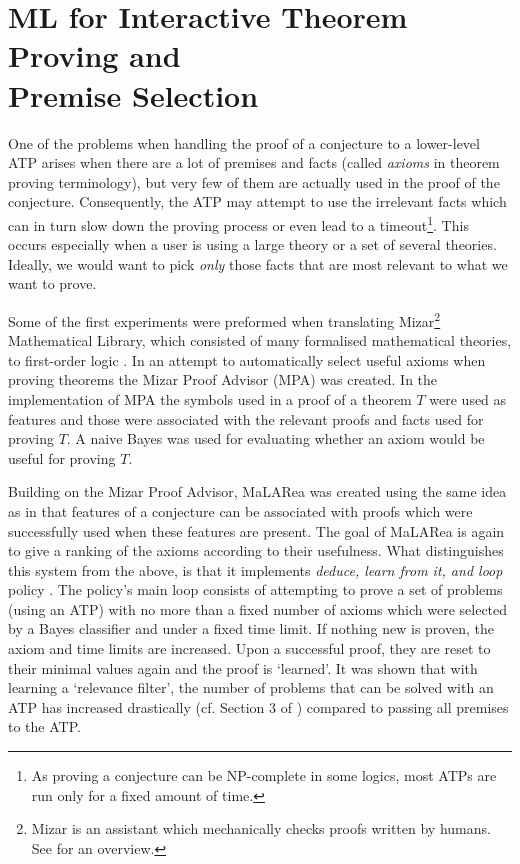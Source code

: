 \documentclass{article}
\begin{document}
\section{ML for Interactive Theorem Proving and\\ Premise Selection}

One of the problems when handling the proof of a conjecture to a lower-level
ATP arises when there are a lot of premises and facts (called \emph{axioms} in
theorem proving terminology), but very few of them are actually used in the
proof of the conjecture. Consequently, the ATP may attempt to use the
irrelevant facts which can in turn slow down the proving process or even lead
to a timeout\footnote{As proving a conjecture can be NP-complete in some
logics, most ATPs are run only for a fixed amount of time.}. This occurs
especially when a user is using a large theory or a set of several theories.
Ideally, we would want to pick \emph{only} those facts that are most relevant
to what we want to prove.

Some of the first experiments were preformed when translating
Mizar\footnote{Mizar is an assistant which mechanically checks proofs written
by humans. See \cite{MizarOverview} for an overview.} Mathematical Library,
which consisted of many formalised mathematical theories, to first-order logic
\citep{MizarProofAdvisor}. In an attempt to automatically select useful axioms
when proving theorems the Mizar Proof Advisor (MPA) was created. In the
implementation of MPA the symbols used in a proof of a theorem $T$ were used as
features and those were associated with the relevant proofs and facts used for
proving $T$. A naive Bayes was used for evaluating whether an axiom would be
useful for proving $T$. 

Building on the Mizar Proof Advisor, MaLARea \citep{MaLARea} was created using
the same idea as in \cite{MizarProofAdvisor} that features of a conjecture can
be associated with proofs which were successfully used when these features are
present. The goal of MaLARea is again to give a ranking of the axioms according
to their usefulness. What distinguishes this system from the above, is that it
implements \emph{deduce, learn from it, and loop} policy \citep[p.~3]{MaLARea}.
The policy's main loop consists of attempting to prove a set of problems (using
an ATP) with no more than a fixed number of axioms which were selected by
a Bayes classifier and under a fixed time limit. If nothing new is proven, the
axiom and time limits are increased. Upon a successful proof, they are reset to
their minimal values again and the proof is `learned'. It was shown that with
learning a `relevance filter', the number of problems that can be solved with
an ATP has increased drastically (cf. Section 3 of \cite{MaLARea}) compared to
passing all premises to the ATP.
\end{document}
